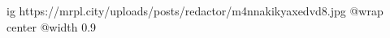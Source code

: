  
 
 
 
 

\ifcmt
  ig https://mrpl.city/uploads/posts/redactor/m4nnakikyaxedvd8.jpg
  @wrap center
  @width 0.9
\fi
